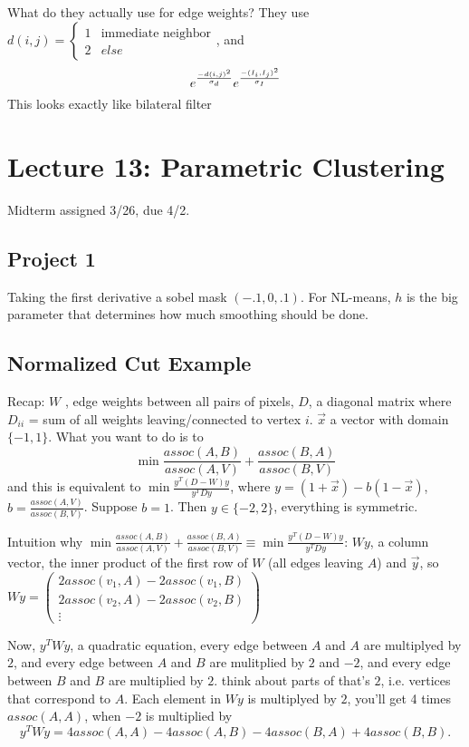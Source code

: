 What do they actually use for edge weights? They use $d(i,j)=
\begin{cases}
  1 & \text{immediate neighbor}\\
  2 & else
\end{cases}$, and 
$$e^{\frac{-d(i,j)^2}{\sigma_d}} e^{\frac{-(I_i, I_j)^2}{\sigma_I}}$$ This
  looks exactly like bilateral filter

\pagebreak

\section{Lecture 13: Parametric Clustering}
\label{sec:lecture-13}
Midterm assigned 3/26, due 4/2.
\subsection{Project 1}
Taking the first derivative a sobel mask $(-.1, 0, .1)$.
For NL-means, $h$ is the big parameter that determines how much
smoothing should be done. 
\subsection{Normalized Cut Example}
Recap: $W$ , edge weights between all pairs of pixels, $D$, a diagonal
matrix where $D_{ii}$ = sum of all weights leaving/connected to vertex
$i$. $\vec x$ a vector with domain $\{-1, 1\}$.
What you want to do is to $$\min \frac{ assoc(A,B)}{assoc(A,V)} +
\frac{ assoc(B,A)}{assoc(B,V)}$$ and this is equivalent to  $\min
\frac{y^T(D-W)y}{y^TDy}$, where $y=(1+\vec x) - b(1-\vec x)$, $b =
\frac{ assoc(A,V)}{assoc(B,V)}$.
Suppose $b=1$. Then $y\in \{-2, 2\}$, everything is symmetric. 

Intuition why $\min \frac{ assoc(A,B)}{assoc(A,V)} +
\frac{ assoc(B,A)}{assoc(B,V)} \equiv \min
\frac{y^T(D-W)y}{y^TDy}$:
$Wy$,  a column vector, the inner product of the first row of $W$ (all
edges leaving $A$) and $\vec y$, so $Wy =
\begin{pmatrix}
  2assoc(v_1, A) - 2assoc(v_1, B) \\
  2assoc(v_2, A) - 2assoc(v_2, B) \\
\vdots
\end{pmatrix}$

Now, $y^TWy$, a quadratic equation, every edge between $A$ and $A$ are
multiplyed by $2$, and every edge between $A$ and $B$ are mulitplied
by $2$ and $-2$, and every edge between $B$ and $B$ are multiplied by
$2$. think about parts of  that's $2$, i.e. vertices that
correspond to $A$. Each element in $Wy$ is multiplyed by $2$, you'll
get 4 times $assoc(A,A)$, when $-2$ is multiplied by 
$$y^TWy = 4 assoc(A,A) -4assoc(A,B)  - 4assoc(B,A) + 4assoc(B,B).$$

